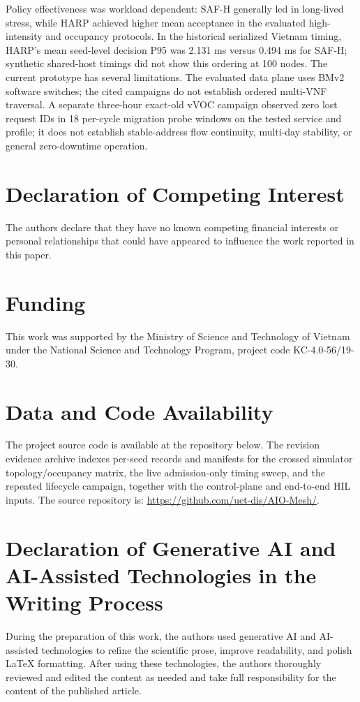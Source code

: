 \documentclass[final,5p]{elsarticle}
\newcommand{\rev}[1]{\textcolor{revisiongreen}{#1}}
\let\newrev\rev
\begin{document}
\newrev{Policy effectiveness was workload dependent: SAF-H generally led in long-lived stress, while HARP achieved higher mean acceptance in the evaluated high-intensity and occupancy protocols. In the historical serialized Vietnam timing, HARP's mean seed-level decision P95 was 2.131 ms versus 0.494 ms for SAF-H; synthetic shared-host timings did not show this ordering at 100 nodes.} The current prototype has several limitations. \newrev{The evaluated data plane uses BMv2 software switches; the cited campaigns do not establish ordered multi-VNF traversal. A separate three-hour exact-old vVOC campaign observed zero lost request IDs in 18 per-cycle migration probe windows on the tested service and profile; it does not establish stable-address flow continuity, multi-day stability, or general zero-downtime operation.}

\section*{Declaration of Competing Interest}
\noindent The authors declare that they have no known competing financial interests or personal relationships that could have appeared to influence the work reported in this paper.


\section*{Funding}
This work was supported by the Ministry of Science and Technology of Vietnam under the National Science and Technology Program, project code KC-4.0-56/19-30.

\section*{Data and Code Availability}
\newrev{The project source code is available at the repository below. The revision evidence archive indexes per-seed records and manifests for the crossed simulator topology/occupancy matrix, the live admission-only timing sweep, and the repeated lifecycle campaign, together with the control-plane and end-to-end HIL inputs. The source repository is:}
\url{https://github.com/uet-dis/AIO-Mesh/}.

\section*{Declaration of Generative AI and AI-Assisted Technologies in the Writing Process}
During the preparation of this work, the authors used generative AI and AI-assisted technologies to refine the scientific prose, improve readability, and polish LaTeX formatting. After using these technologies, the authors thoroughly reviewed and edited the content as needed and take full responsibility for the content of the published article.
\end{document}

